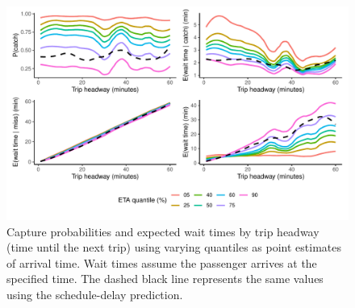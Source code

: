 \begin{knitrout}\small
{}\color{fgcolor}\begin{figure}

{\centering \includegraphics[width=\textwidth]{figure/eta_headway_results-1} 

}

\caption[Capture probabilities and expected wait times by trip headway]{Capture probabilities and expected wait times by trip headway (time until the next trip) using varying quantiles as point estimates of arrival time. Wait times assume the passenger arrives at the specified time. The dashed black line represents the same values using the schedule-delay prediction.}\label{fig:eta_headway_results}
\end{figure}


\end{knitrout}
